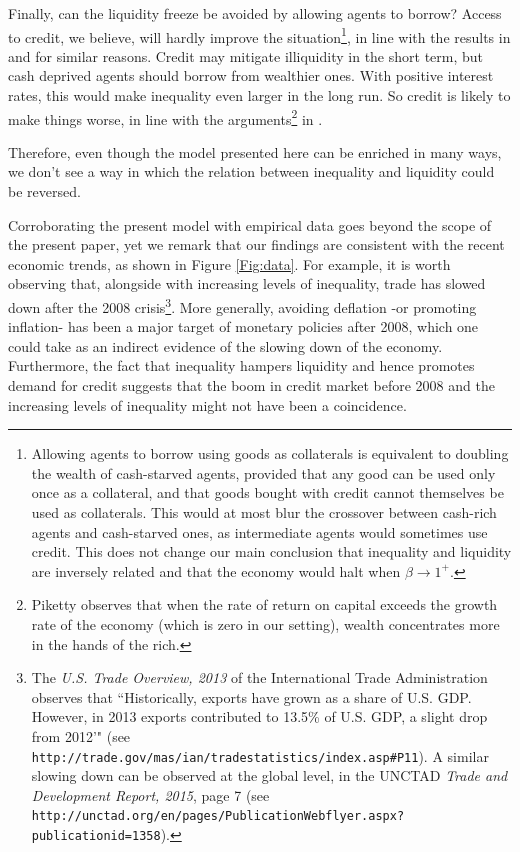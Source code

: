 Finally, can the liquidity freeze be avoided by allowing agents to borrow? Access to credit, we believe, will hardly improve the situation\footnote{Allowing agents to borrow using goods as collaterals is equivalent to doubling the
wealth of cash-starved agents, provided that any good can be used only once as a collateral, and that goods bought with credit cannot themselves be used as collaterals.  This would at most blur the crossover between cash-rich agents and cash-starved ones, as intermediate agents would sometimes use credit. This does not change our main conclusion that inequality and liquidity are inversely related and that the economy would halt when $\beta \to 1^{+}$.}, in line with the results in \cite{Yakovenko2009Review} and for similar reasons. Credit may mitigate illiquidity in the short term, but cash deprived agents should borrow from wealthier ones. With positive interest rates, this would make inequality even larger in the long run. So credit is likely to make things worse, in line with the arguments\footnote{Piketty \cite{Piketty2014} observes that when the rate of return on capital exceeds the growth rate of the economy (which is zero in our setting), wealth concentrates more in the hands of the rich.} in \cite{Piketty2014}.

Therefore, even though the model presented here can be enriched in many ways, we don't see a way in which the relation between inequality and liquidity could be reversed. 

Corroborating the present model with empirical data goes beyond the scope of the present paper, yet we remark that our findings are consistent with the recent economic trends, as shown in Figure \ref{Fig:data}.  For example, it is worth observing that, alongside with increasing levels of inequality, trade 
has slowed down after the 2008 crisis\footnote{The {\em U.S. Trade Overview, 2013} of the International Trade Administration observes that ``Historically, exports have grown as a share of U.S. GDP. However, in 2013 exports contributed to 13.5\% of U.S. GDP, a slight drop from 2012'" (see {\tt http://trade.gov/mas/ian/tradestatistics/index.asp{\#P}11}). A similar slowing down can be observed at the global level, in the UNCTAD {\em Trade and Development Report, 2015}, page 7 (see {\tt http://unctad.org/en/pages/PublicationWebflyer.aspx?publicationid=1358}).}. More generally, avoiding deflation -or promoting inflation- has been a major target of monetary policies after 2008, which one could take as an indirect evidence of the slowing down of the economy.  Furthermore, the fact that inequality hampers liquidity and hence promotes demand for credit suggests that the boom in credit market before 2008 and the increasing levels of inequality might not have been a coincidence. 

